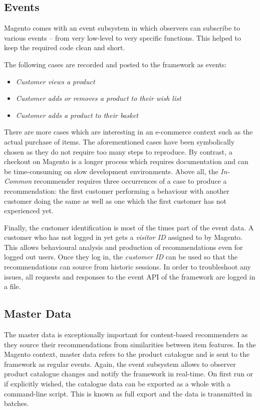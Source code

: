 \subsection{Events}
\label{implementation-magento-events}

Magento comes with an event subsystem in which observers can subscribe to various events -- from very low-level to very specific functions. This helped to keep the required code clean and short.

The following cases are recorded and posted to the framework as events:

\begin{itemize}
\item \emph{Customer views a product}
\item \emph{Customer adds or removes a product to their wish list}
\item \emph{Customer adds a product to their basket}
\end{itemize}

There are more cases which are interesting in an e-commerce context such as the actual purchase of items. The aforementioned cases have been symbolically chosen as they do not require too many steps to reproduce. By contrast, a checkout on Magento is a longer process which requires documentation and can be time-consuming on slow development environments. Above all, the \emph{In-Common} recommender requires three occurrences of a case to produce a recommendation: the first customer performing a behaviour with another customer doing the same as well as one which the first customer has not experienced yet.

Finally, the customer identification is most of the times part of the event data. A customer who has not logged in yet gets a \emph{visitor ID} assigned to by Magento. This allows behavioural analysis and production of recommendations even for logged out users. Once they log in, the \emph{customer ID} can be used so that the recommendations can source from historic sessions. In order to troubleshoot any issues, all requests and responses to the event API of the framework are logged in a file.

\subsection{Master Data}
\label{implementation-magento-masterdata}

The master data is exceptionally important for content-based recommenders as they source their recommendations from similarities between item features. In the Magento context, master data refers to the product catalogue and is sent to the framework as regular events. Again, the event subsystem allows to observer product catalogue changes and notify the framework in real-time. On first run or if explicitly wished, the catalogue data can be exported as a whole with a command-line script. This is known as full export and the data is transmitted in batches.


